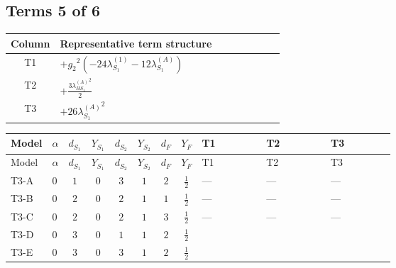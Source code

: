 \documentclass[8pt]{article}
\begin{document}
\begin{landscape}
\subsection*{Terms 5 of 6}
\begin{center}
\begin{tabular}{@{}c >{\raggedright\arraybackslash}p{0.82\linewidth}@{}}
\toprule
Column & Representative term structure \\
\midrule
T1 & \(\displaystyle +{g_2}^2 (-24 {\lambda_{S_1}^{(1)}}-12 {\lambda_{S_1}^{(A)}})\) \\
\midrule
T2 & \(\displaystyle +\frac{3 {\lambda_{HS_1}^{(A)}}^2}{2}\) \\
\midrule
T3 & \(\displaystyle +26 {\lambda_{S_1}^{(A)}}^2\) \\
\midrule
\bottomrule
\end{tabular}
\end{center}
\smallskip
\tiny
\begin{longtable}{@{}llcccccc >{\raggedright\arraybackslash}p{0.21\linewidth} >{\raggedright\arraybackslash}p{0.21\linewidth} >{\raggedright\arraybackslash}p{0.21\linewidth}@{}}
\toprule
Model & $\alpha$ & $d_{S_1}$ & $Y_{S_1}$ & $d_{S_2}$ & $Y_{S_2}$ & $d_F$ & $Y_F$ & T1 & T2 & T3 \\
\midrule
\endfirsthead
\toprule
Model & $\alpha$ & $d_{S_1}$ & $Y_{S_1}$ & $d_{S_2}$ & $Y_{S_2}$ & $d_F$ & $Y_F$ & T1 & T2 & T3 \\
\midrule
\endhead
T3-A & $0$ & $1$ & $0$ & $3$ & $1$ & $2$ & $\frac{1}{2}$ & --- & --- & --- \\
\midrule
T3-B & $0$ & $2$ & $0$ & $2$ & $1$ & $1$ & $\frac{1}{2}$ & --- & --- & --- \\
\midrule
T3-C & $0$ & $2$ & $0$ & $2$ & $1$ & $3$ & $\frac{1}{2}$ & --- & --- & --- \\
\midrule
T3-D & $0$ & $3$ & $0$ & $1$ & $1$ & $2$ & $\frac{1}{2}$ & \scriptsize\adjustbox{max width=\linewidth}{$\begin{gathered} +{g_2}^2 (-24 {\lambda_{S_1}^{(1)}}-12 {\lambda_{S_1}^{(A)}})\end{gathered}$} & \scriptsize\adjustbox{max width=\linewidth}{$\begin{gathered} +\frac{3 {\lambda_{HS_1}^{(A)}}^2}{2}\end{gathered}$} & \scriptsize\adjustbox{max width=\linewidth}{$\begin{gathered} +26 {\lambda_{S_1}^{(A)}}^2\end{gathered}$} \\
\midrule
T3-E & $0$ & $3$ & $0$ & $3$ & $1$ & $2$ & $\frac{1}{2}$ & \scriptsize\adjustbox{max width=\linewidth}{$\begin{gathered} +{g_2}^2 (-24 {\lambda_{S_1}^{(1)}}-12 {\lambda_{S_1}^{(A)}})\end{gathered}$} & \scriptsize\adjustbox{max width=\linewidth}{$\begin{gathered} +\frac{3 {\lambda_{HS_1}^{(A)}}^2}{2}\end{gathered}$} & \scriptsize\adjustbox{max width=\linewidth}{$\begin{gathered} +26 {\lambda_{S_1}^{(A)}}^2\end{gathered}$} \\

\end{longtable}
\end{landscape}
\end{document}

